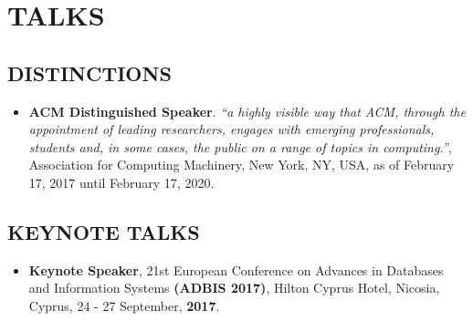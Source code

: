 \documentclass[10pt]{article}
\begin{document}
\renewcommand{\labelitemi}{$\bullet$}

\section{\bf TALKS }

\subsection*{\bf DISTINCTIONS}
\begin{itemize}
\setlength{\itemsep}{0.10ex}
\item {\bf ACM Distinguished Speaker}.  {\em ``a highly visible way that ACM, through the appointment of leading researchers, engages with emerging professionals, students and, in some cases, the public on a range of topics in computing.''}, Association for Computing Machinery, New York, NY, USA, as of February 17, 2017 until February 17, 2020.
\end{itemize}

\subsection*{\bf KEYNOTE TALKS}
\begin{itemize}
\setlength{\itemsep}{0.10ex}
\item  {\bf Keynote Speaker}, 21st European Conference on Advances in Databases and Information Systems {\bf (ADBIS 2017)}, Hilton Cyprus Hotel, Nicosia, Cyprus, 24 - 27 September, {\bf 2017}.
\end{itemize}
\end{document}
